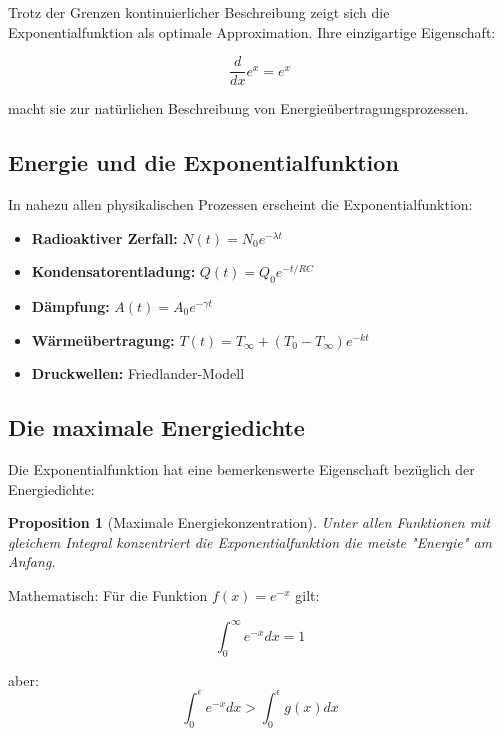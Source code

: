 ﻿\documentclass[12pt,a4paper]{article}
\newtheorem{proposition}[theorem]{Proposition}
\theoremstyle{definition}
\theoremstyle{remark}
\begin{document}
Trotz der Grenzen kontinuierlicher Beschreibung zeigt sich die Exponentialfunktion als optimale Approximation. Ihre einzigartige Eigenschaft:

\begin{equation}
\frac{d}{dx} e^x = e^x
\end{equation}

macht sie zur natürlichen Beschreibung von Energieübertragungsprozessen.

\subsection{Energie und die Exponentialfunktion}

In nahezu allen physikalischen Prozessen erscheint die Exponentialfunktion:

\begin{itemize}
\item \textbf{Radioaktiver Zerfall:} $N(t) = N_0 e^{-\lambda t}$
\item \textbf{Kondensatorentladung:} $Q(t) = Q_0 e^{-t/RC}$
\item \textbf{Dämpfung:} $A(t) = A_0 e^{-\gamma t}$
\item \textbf{Wärmeübertragung:} $T(t) = T_\infty + (T_0 - T_\infty)e^{-kt}$
\item \textbf{Druckwellen:} Friedlander-Modell
\end{itemize}

\subsection{Die maximale Energiedichte}

Die Exponentialfunktion hat eine bemerkenswerte Eigenschaft bezüglich der Energiedichte:

\begin{proposition}[Maximale Energiekonzentration]
Unter allen Funktionen mit gleichem Integral konzentriert die Exponentialfunktion die meiste "Energie" am Anfang.
\end{proposition}

Mathematisch: Für die Funktion $f(x) = e^{-x}$ gilt:

\begin{equation}
\int_0^\infty e^{-x} dx = 1
\end{equation}

aber:
\begin{equation}
\int_0^{\epsilon} e^{-x} dx > \int_0^{\epsilon} g(x) dx
\end{equation}
\end{document}
